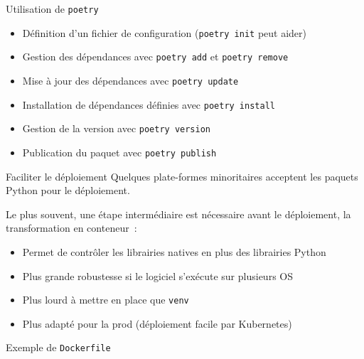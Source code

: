 \begin{frame}{Utilisation de \texttt{poetry}}
  \begin{itemize}[<+->]
    \item Définition d'un fichier de configuration (\texttt{poetry init} peut aider)
    \item Gestion des dépendances avec \texttt{poetry add} et \texttt{poetry remove}
    \item Mise à jour des dépendances avec \texttt{poetry update}
    \item Installation de dépendances définies avec \texttt{poetry install}
    \item Gestion de la version avec \texttt{poetry version}
    \item Publication du paquet avec \texttt{poetry publish}
  \end{itemize}
\end{frame}

\begin{frame}{Faciliter le déploiement}
  Quelques plate-formes minoritaires acceptent les paquets Python pour le déploiement.

  Le plus souvent, une étape intermédiaire est nécessaire avant le déploiement, la transformation en conteneur~:

  \begin{itemize}[<+->]
    \item Permet de contrôler les librairies natives en plus des librairies Python
    \item Plus grande robustesse si le logiciel s'exécute sur plusieurs OS
    \item Plus lourd à mettre en place que \texttt{venv}
    \item Plus adapté pour la prod (déploiement facile par Kubernetes)
  \end{itemize}

\end{frame}

\begin{frame}{Exemple de \texttt{Dockerfile}}
\end{frame}